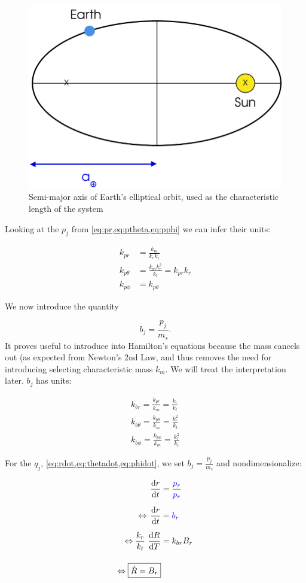 \begin{figure}[ht]
    \centering
    \includegraphics[width=0.60\linewidth]{fig/earth-semi-major-axis}
    \caption{Semi-major axis of Earth's elliptical orbit, used as the characteristic length of the system}
    \label{fig:earth-semi-major-axis}
\end{figure}

Looking at the \(p_j\) from \cref{eq:pr,eq:ptheta,eq:pphi} we can infer their units:

\begin{align}
    k_{pr} &= \frac{k_m}{k_r k_t} \\[0.2cm]
    k_{p\theta} &= \frac{k_m k_r^2}{k_t} = k_{pr} k_r \\[0.2cm]
    k_{p\phi} &= k_{p\theta}
\end{align}

We now introduce the quantity

\begin{equation}
    b_j = \frac{p_j}{m_s}.
\end{equation}
It proves useful to introduce into Hamilton's equations because the mass cancels out (as expected from Newton's 2nd Law, and thus removes the need for introducing  selecting characteristic mass \(k_m\). We will treat the interpretation later. \(b_j\) has units:

\begin{align}
    k_{br} = \frac{k_{pr}}{k_m} = \frac{k_r}{k_t} \\[0.2cm]
    k_{b\theta} = \frac{k_{p\theta}}{k_m} = \frac{k_r^2}{k_t} \\[0.2cm]
    k_{b\phi} = \frac{k_{p\phi}}{k_m} = \frac{k_r^2}{k_t}
\end{align}

For the \(q_j\), \cref{eq:rdot,eq:thetadot,eq:phidot}, we set \(b_j = \frac{p_j}{m_s}\) and nondimensionalize:

\begin{align}
    \operatorname{}\frac{\mathrm{d} r}{\mathrm{d} t} &= \frac{\textcolor{blue}{p_r}}{\textcolor{blue}{p_r}} \\[0.2cm]
    \Leftrightarrow \operatorname{}\frac{\mathrm{d} r}{\mathrm{d} t} &= \textcolor{blue}{b_r} \\[0.2cm]
    \Leftrightarrow \frac{k_r}{k_t} \operatorname{}\frac{\mathrm{d} R}{\mathrm{d} T} &= k_{br} B_r \\[0.4cm]
    \Leftrightarrow \boxed{\dot{R} = B_r}
\end{align}

